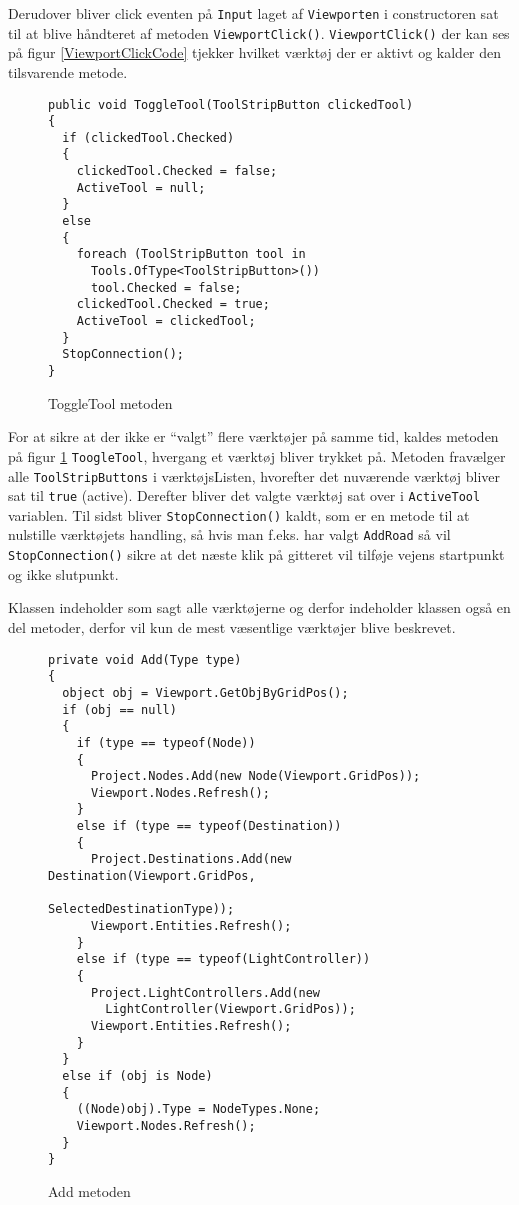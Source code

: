 Derudover bliver click eventen på \texttt{Input} laget af \texttt{Viewporten} i constructoren sat til at blive håndteret af metoden \texttt{ViewportClick()}. \texttt{ViewportClick()} der kan ses på figur \ref{ViewportClickCode} tjekker hvilket værktøj der er aktivt og kalder den tilsvarende metode.

\begin{figure}[H]
\begin{lstlisting}
public void ToggleTool(ToolStripButton clickedTool)
{
  if (clickedTool.Checked)
  {
    clickedTool.Checked = false;
    ActiveTool = null;
  }
  else
  {
    foreach (ToolStripButton tool in 
      Tools.OfType<ToolStripButton>())
      tool.Checked = false;
    clickedTool.Checked = true;
    ActiveTool = clickedTool;
  }
  StopConnection();
}
\end{lstlisting}
\caption{ToggleTool metoden}\label{ToggleToolCode}
\end{figure}

For at sikre at der ikke er “valgt” flere værktøjer på samme tid, kaldes metoden på figur \ref{ToggleToolCode} \texttt{ToogleTool}, hvergang et værktøj bliver trykket på. Metoden fravælger alle \texttt{ToolStripButtons} i værktøjsListen, hvorefter det nuværende værktøj bliver sat til \texttt{true} (active). Derefter bliver det valgte værktøj sat over i \texttt{ActiveTool} variablen. Til sidst bliver \texttt{StopConnection()} kaldt, som er en metode til at nulstille værktøjets handling, så hvis man f.eks. har valgt \texttt{AddRoad} så vil \texttt{StopConnection()} sikre at det næste klik på gitteret vil tilføje vejens startpunkt og ikke slutpunkt.

\vspace{5mm}

Klassen indeholder som sagt alle værktøjerne og derfor indeholder klassen også en del metoder, derfor vil kun de mest væsentlige værktøjer blive beskrevet.

\begin{figure}[H]
\begin{lstlisting}
private void Add(Type type)
{
  object obj = Viewport.GetObjByGridPos();
  if (obj == null)
  {
    if (type == typeof(Node))
    {
      Project.Nodes.Add(new Node(Viewport.GridPos));
      Viewport.Nodes.Refresh();
    }
    else if (type == typeof(Destination))
    {
      Project.Destinations.Add(new Destination(Viewport.GridPos,  
                                   SelectedDestinationType));
      Viewport.Entities.Refresh();
    }
    else if (type == typeof(LightController))
    {
      Project.LightControllers.Add(new 
        LightController(Viewport.GridPos));
      Viewport.Entities.Refresh();
    }
  }
  else if (obj is Node)
  {
    ((Node)obj).Type = NodeTypes.None;
    Viewport.Nodes.Refresh();
  }
}
\end{lstlisting}
\caption{Add metoden}\label{AddCode}
\end{figure}


